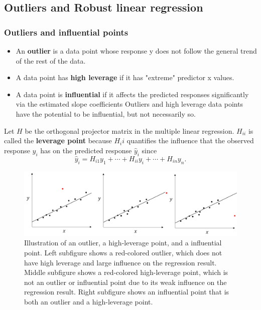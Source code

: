 \begin{refsection}
\subsection{Outliers and Robust linear regression}

\subsubsection{Outliers and influential points}

\begin{definition}\hfill
\begin{itemize}
	\item An \textbf{outlier} is a data point whose response y does not follow the general trend of the rest of the data.
	\item A data point has \textbf{high leverage} if it has "extreme" predictor x values.
	\item A data point is \textbf{influential} if it affects the predicted responses significantly via the estimated slope coefficients Outliers and high leverage data points have the potential to be influential, but not necessarily so.
\end{itemize}	
\end{definition}


\begin{definition}[leverage]
Let $H$ be the orthogonal projector matrix in the multiple linear regression. $H_{ii}$ is called the \textbf{leverage point} because $H_ii$ quantifies the influence that the observed response $y_i$ has on the predicted response $\hat{y}_i$ since
$$\hat{y}_i = H_{i1}y_1 + \cdots + H_{ii}y_i + \cdots + H_{in}y_n.$$	
\end{definition}

\begin{figure}[H]
	\centering
	\includegraphics[width=1\linewidth]{../figures/statisticalModeling/regressionAnalysis/influencePointsLinearRegression}
	\caption{Illustration of an outlier, a high-leverage point, and a influential point. Left subfigure shows a red-colored outlier, which does not have high leverage and large influence on the regression result. Middle subfigure shows a red-colored high-leverage point, which is not an outlier or influential point due to its weak influence on the regression result. Right subfigure shows an influential point that is both an outlier and a high-leverage point.}
	\label{fig:influencepointslinearregression}
\end{figure}



\end{refsection}
